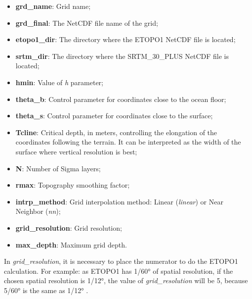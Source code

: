 \begin{itemize}
\item \textbf{grd\_name}: Grid name;
\item \textbf{grd\_final}: The NetCDF file name of the grid;
\item \textbf{etopo1\_dir}: The directory where the ETOPO1 NetCDF file is located;
\item\textbf{srtm\_dir}: The directory where the SRTM\_30\_PLUS NetCDF file is located; 
\item \textbf{hmin}: Value of \textit{h} parameter;
\item \textbf{theta\_b}: Control parameter for coordinates close to the ocean floor;
\item \textbf{theta\_s}: Control parameter for coordinates close to the surface;
\item \textbf{Tcline}: Critical depth, in meters, controlling the elongation of the coordinates following the terrain. It can be interpreted as the width of the surface where vertical resolution is best;
\item \textbf{N}: Number of Sigma layers;
\item \textbf{rmax}: Topography smoothing factor;
\item \textbf{intrp\_method}: Grid interpolation method: Linear (\textit{linear}) or Near Neighbor (\textit{nn});
\item \textbf{grid\_resolution}: Grid resolution;
\item\textbf{max\_depth}: Maximum grid depth.
\end{itemize}
\bigskip

\begin{tcolorbox}[enhanced,
    grow to left by   = 0cm,
    grow to right by  = 0cm,
    enlarge top by    = 0cm,
    enlarge bottom by = 0cm,
    tcbox raise base,
    boxrule           = 1.0pt,
    left              = 18mm,
    colframe          = red!50!black,coltext=red!25!black,colback=red!10!white,
    overlay           = {\begin{tcbclipinterior}\fill[red!75!blue!50!white] (frame.south west)
      rectangle node[text=white,font=\sffamily\bfseries\footnotesize,rotate=0] {WARNING} ([xshift=18mm]frame.north west);\end{tcbclipinterior}}]
      In \textit{grid\_resolution}, it is necessary to place the numerator to do the ETOPO1 calculation. For example: as ETOPO1 has 1/60° of spatial resolution, if the chosen spatial resolution is 1/12°, the value of \textit{grid\_resolution} will be 5, because 5/60° is the same as 1/12° .\end{tcolorbox}
\bigskip

